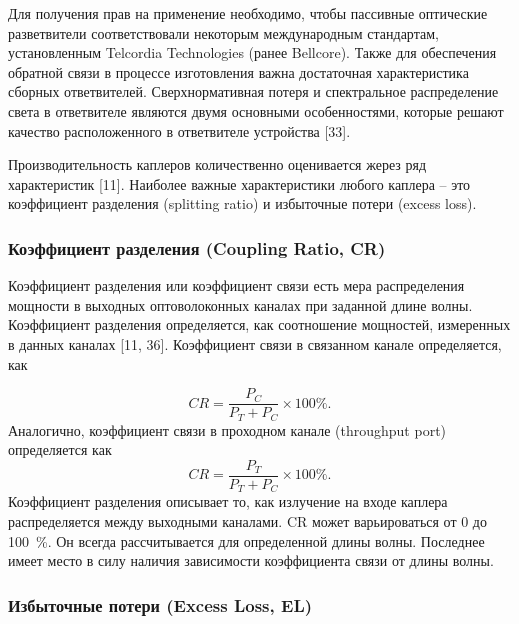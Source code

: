 Для получения прав на применение необходимо, чтобы пассивные оптические разветвители соответствовали некоторым международным стандартам, установленным Telcordia Technologies (ранее Bellcore). Также для обеспечения обратной связи в процессе изготовления важна достаточная характеристика сборных ответвителей. Сверхнормативная потеря и спектральное распределение света в ответвителе являются двумя основными особенностями, которые решают качество расположенного в ответвителе устройства [33].


Производительность каплеров количественно оценивается жерез ряд характеристик [11]. Наиболее важные характеристики любого каплера -- это коэффициент разделения (splitting ratio) и избыточные потери (excess loss).

\subsubsection*{\textbf{Коэффициент разделения (Coupling Ratio, CR)}}

Коэффициент разделения или коэффициент связи есть мера распределения мощности в выходных оптоволоконных каналах при заданной длине волны. Коэффициент разделения определяется, как соотношение мощностей, измеренных в данных каналах [11, 36]. Коэффициент связи в связанном канале определяется, как

\begin{equation}\label{eq_ch3_2.28_2}
  CR=\frac{P_C}{P_T+P_C}\times 100\%.
\end{equation}
Аналогично, коэффициент связи в проходном канале (throughput port) определяется как
\begin{equation}\label{eq_ch3_2.29}
  CR=\frac{P_T}{P_T+P_C}\times 100\%.
\end{equation}
Коэффициент разделения описывает то, как излучение на входе каплера распределяется между выходными каналами. CR может варьироваться от 0 до 100~\%. Он всегда рассчитывается для определенной длины волны. Последнее имеет место в силу наличия зависимости коэффициента связи от длины волны.

\subsubsection*{\textbf{Избыточные потери (Excess Loss, EL)}}

